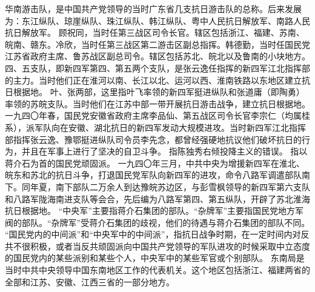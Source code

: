 \begin{maonote}
华南游击队，是中国共产党领导的当时广东省几支抗日游击队的总称。后来发展为：东江纵队、琼崖纵队、珠江纵队、韩江纵队、粤中人民抗日解放军、南路人民抗日解放军。
顾祝同，当时任第三战区司令长官。辖区包括浙江、福建、苏南、皖南、赣东。冷欣，当时任第三战区第二游击区副总指挥。韩德勤，当时任国民党江苏省政府主席、鲁苏战区副总司令。辖区包括苏北、皖北以及鲁南的小块地方。
四、五支队，即新四军第四、第五两个支队，是张云逸任指挥的新四军江北指挥部的主力。当时他们正在淮河以南、长江以北、运河以西、淮南铁路以东地区建立抗日根据地。
叶、张两部，这里指叶飞率领的新四军挺进纵队和张道庸（即陶勇）率领的苏皖支队。当时他们在江苏中部一带开展抗日游击战争，建立抗日根据地。
一九四〇年春，国民党安徽省政府主席李品仙、第五战区司令长官李宗仁（均属桂系），派军队向在安徽、湖北抗日的新四军发动大规模进攻。当时新四军江北指挥部指挥张云逸、豫鄂挺进纵队司令员李先念，都曾经强硬地抗议他们破坏抗日的行为，并且在军事上进行了坚决的自卫斗争。
指陈独秀右倾投降主义的错误。
指以蒋介石为首的国民党顽固派。
一九四〇年三月，中共中央为增援新四军在淮北、皖东和苏北的抗日斗争，打退国民党军队向新四军的进攻，命令八路军调遣部队南下。同年夏，南下部队二万余人到达豫皖苏边区，与彭雪枫领导的新四军第六支队和八路军陇海南进支队等会合，先后编为八路军第四、第五纵队，开辟了苏北淮海抗日根据地。
“中央军”主要指蒋介石集团的部队。“杂牌军”主要指国民党地方军阀的部队。“杂牌军”受蒋介石集团的歧视，他们的待遇与蒋介石集团的部队不同。
“国民党内的中间派”和“中央军中的中间派”，指抗日战争时期，在一定时间内对反共不很积极，或者当反共顽固派向中国共产党领导的军队进攻的时候采取中立态度的国民党内的某些派别和某些个人，中央军中的某些军官或个别部队。
东南局是当时中共中央领导中国东南地区工作的代表机关。这个地区包括浙江、福建两省的全部和江苏、安徽、江西三省的一部分地方。
\end{maonote}
